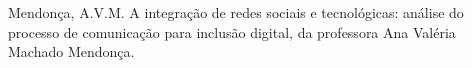 \documentclass[
12pt,		%
openright,	%
twoside,  %
a4paper,			%
chapter=TITLE,		%
english,			%
french,				%
spanish,			%
brazil				%
]{USPSC-classe/USPSC}
\begin{document}
\begin{flushleft}
\begin{flushleft}
\begin{flushleft}
\begin{flushleft}
\begin{flushleft}
\begin{flushleft}
\begin{flushleft}
\begin{flushleft}
\begin{flushleft}
\begin{flushleft}
[MENDON\c{C}A, 2015] Mendon\c{c}a, A.V.M. A integra\c{c}\~ao de redes sociais e tecnol\'ogicas: an\'alise do processo de comunica\c{c}\~ao para inclus\~ao digital, da professora Ana Val\'eria  Machado  Mendon\c{c}a.
\end{flushleft}


\end{flushleft}


\end{flushleft}


\end{flushleft}


\end{flushleft}


\end{flushleft}


\end{flushleft}


\end{flushleft}


\end{flushleft}


\end{flushleft}
\end{document}
